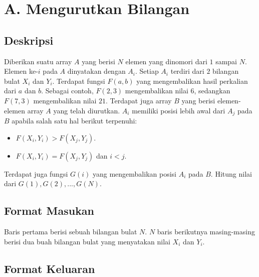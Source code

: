 \documentclass{article}
\begin{document}
\section*{\hfil A. Mengurutkan Bilangan\hfil}


\subsection*{Deskripsi}

\par\noindent Diberikan suatu array $A$ yang berisi $N$ elemen yang dinomori dari $1$ sampai $N$. Elemen ke-$i$ pada $A$ dinyatakan dengan $A_i$. Setiap $A_i$ terdiri dari $2$ bilangan bulat $X_i$ dan $Y_i$. Terdapat fungsi $F(a,b)$ yang mengembalikan hasil perkalian dari $a$ dan $b$. Sebagai contoh, $F(2,3)$ mengembalikan nilai $6$, sedangkan $F(7,3)$ mengembalikan nilai $21$. Terdapat juga array $B$ yang berisi elemen-elemen array $A$ yang telah diurutkan. $A_i$ memiliki posisi lebih awal dari $A_j$ pada $B$ apabila salah satu hal berikut terpenuhi:

\begin{itemize}
	\item $F(X_i,Y_i) > F(X_j, Y_j)$.
	\item $F(X_i,Y_i) = F(X_j, Y_j)$ dan $i < j$.
\end{itemize}

\par\noindent Terdapat juga fungsi $G(i)$ yang mengembalikan posisi $A_i$ pada $B$. Hitung nilai dari $G(1), G(2), ... , G(N)$. 

\subsection*{Format Masukan}

\par\noindent Baris pertama berisi sebuah bilangan bulat $N$. $N$ baris berikutnya masing-masing berisi dua buah bilangan bulat yang menyatakan nilai $X_i$ dan $Y_i$.

\subsection*{Format Keluaran}
\end{document}
